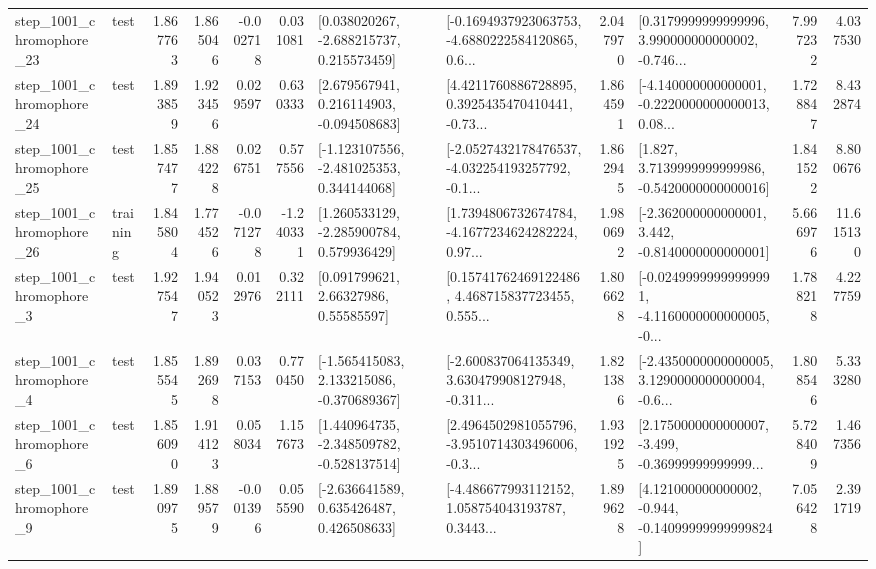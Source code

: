 \begin{tabular}{llrrrrllrlrr}
 step\_1001\_chromophore\_23 &      test &      1.867763 &    1.865046 &     -0.002718 &  0.031081 &    [0.038020267, -2.688215737, 0.215573459] &  [-0.1694937923063753, -4.6880222584120865, 0.6... &       2.047970 &  [0.3179999999999996, 3.990000000000002, -0.746... &            7.997232 &          4.037530 \\
 step\_1001\_chromophore\_24 &      test &      1.893859 &    1.923456 &      0.029597 &  0.630333 &    [2.679567941, 0.216114903, -0.094508683] &  [4.4211760886728895, 0.3925435470410441, -0.73... &       1.864591 &  [-4.140000000000001, -0.2220000000000013, 0.08... &            1.728847 &          8.432874 \\
 step\_1001\_chromophore\_25 &      test &      1.857477 &    1.884228 &      0.026751 &  0.577556 &   [-1.123107556, -2.481025353, 0.344144068] &  [-2.0527432178476537, -4.032254193257792, -0.1... &       1.862945 &   [1.827, 3.7139999999999986, -0.5420000000000016] &            1.841522 &          8.800676 \\
 step\_1001\_chromophore\_26 &  training &      1.845804 &    1.774526 &     -0.071278 & -1.240331 &    [1.260533129, -2.285900784, 0.579936429] &  [1.7394806732674784, -4.1677234624282224, 0.97... &       1.980692 &   [-2.362000000000001, 3.442, -0.8140000000000001] &            5.666976 &         11.615130 \\
  step\_1001\_chromophore\_3 &      test &      1.927547 &    1.940523 &      0.012976 &  0.322111 &       [0.091799621, 2.66327986, 0.55585597] &  [0.15741762469122486, 4.468715837723455, 0.555... &       1.806628 &  [-0.02499999999999991, -4.1160000000000005, -0... &            1.788218 &          4.227759 \\
  step\_1001\_chromophore\_4 &      test &      1.855545 &    1.892698 &      0.037153 &  0.770450 &   [-1.565415083, 2.133215086, -0.370689367] &  [-2.600837064135349, 3.630479908127948, -0.311... &       1.821386 &  [-2.4350000000000005, 3.1290000000000004, -0.6... &            1.808546 &          5.333280 \\
  step\_1001\_chromophore\_6 &      test &      1.856090 &    1.914123 &      0.058034 &  1.157673 &   [1.440964735, -2.348509782, -0.528137514] &  [2.4964502981055796, -3.9510714303496006, -0.3... &       1.931925 &  [2.1750000000000007, -3.499, -0.36999999999999... &            5.728409 &          1.467356 \\
  step\_1001\_chromophore\_9 &      test &      1.890975 &    1.889579 &     -0.001396 &  0.055590 &    [-2.636641589, 0.635426487, 0.426508633] &  [-4.486677993112152, 1.058754043193787, 0.3443... &       1.899628 &  [4.121000000000002, -0.944, -0.14099999999999824] &            7.056428 &          2.391719 \\

\end{tabular}

